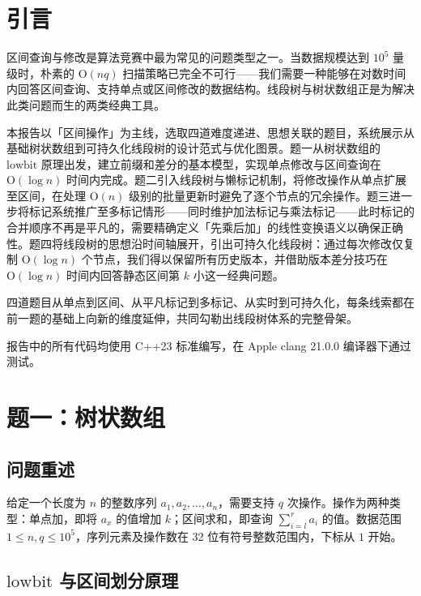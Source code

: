 \documentclass[12pt, a4paper]{academics}
\begin{document}
\makeacademicscover

\section{引言}

区间查询与修改是算法竞赛中最为常见的问题类型之一。当数据规模达到 $10^5$ 量级时，朴素的 $\mathrm{O}(nq)$ 扫描策略已完全不可行——我们需要一种能够在对数时间内回答区间查询、支持单点或区间修改的数据结构。线段树与树状数组正是为解决此类问题而生的两类经典工具。

本报告以「区间操作」为主线，选取四道难度递进、思想关联的题目，系统展示从基础树状数组到可持久化线段树的设计范式与优化图景。题一从树状数组的 $\mathrm{lowbit}$ 原理出发，建立前缀和差分的基本模型，实现单点修改与区间查询在 $\mathrm{O}(\log n)$ 时间内完成。题二引入线段树与懒标记机制，将修改操作从单点扩展至区间，在处理 $\mathrm{O}(n)$ 级别的批量更新时避免了逐个节点的冗余操作。题三进一步将标记系统推广至多标记情形——同时维护加法标记与乘法标记——此时标记的合并顺序不再是平凡的，需要精确定义「先乘后加」的线性变换语义以确保正确性。题四将线段树的思想沿时间轴展开，引出可持久化线段树：通过每次修改仅复制 $\mathrm{O}(\log n)$ 个节点，我们得以保留所有历史版本，并借助版本差分技巧在 $\mathrm{O}(\log n)$ 时间内回答静态区间第 $k$ 小这一经典问题。

四道题目从单点到区间、从平凡标记到多标记、从实时到可持久化，每条线索都在前一题的基础上向新的维度延伸，共同勾勒出线段树体系的完整骨架。

报告中的所有代码均使用 C++23 标准编写，在 Apple clang 21.0.0 编译器下通过测试。

\section{题一：树状数组}

\subsection{问题重述}

给定一个长度为 $n$ 的整数序列 $a_1, a_2, \dots, a_n$，需要支持 $q$ 次操作。操作为两种类型：单点加，即将 $a_x$ 的值增加 $k$；区间求和，即查询 $\sum_{i=l}^{r} a_i$ 的值。数据范围 $1 \le n, q \le 10^5$，序列元素及操作数在 32 位有符号整数范围内，下标从 $1$ 开始。

\subsection{$\mathrm{lowbit}$ 与区间划分原理}
\end{document}
